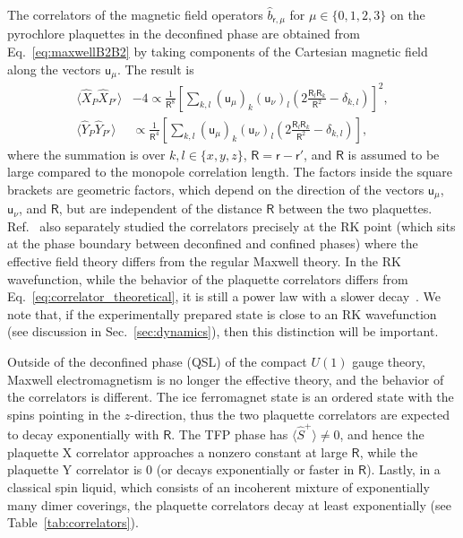 \documentclass[twocolumn,superscriptaddress,amsmath,amssymb,aps,prx,nofootinbib]{revtex4-2}
\newcommand{\dual}[1]{\boldsymbol{\mathsf{#1}}}
\begin{document}
The correlators of the magnetic field operators $\hat{b}_{\dual{r},\mu}$ for $\mu \in \{ 0,1,2,3 \}$ on the pyrochlore plaquettes in the deconfined phase are obtained from Eq.~\eqref{eq:maxwellB2B2} by taking components of the Cartesian magnetic field along the vectors $\dual{u}_\mu$.
The result is
\begin{equation}\label{eq:correlator_theoretical}
  \begin{aligned}
    \langle \hat{X}_P \hat{X}_{P'} \rangle &-4 \propto \frac{1}{\mathsf{R}^8} \left[ \sum_{k,l  } ( \dual{u}_\mu )_k ( \dual{u}_\nu )_l  \left(  2 \frac{\mathsf{R}_l \mathsf{R}_k}{\mathsf{R}^2} -  \delta_{k,l} \right) \right]^2 ,\\
    \langle \hat{Y}_P \hat{Y}_{P'} \rangle &  \propto \frac{1}{\mathsf{R}^4} \left[ \sum_{k,l  } ( \dual{u}_\mu )_k ( \dual{u}_\nu )_l  \left(  2 \frac{\mathsf{R}_l \mathsf{R}_k}{\mathsf{R}^2} -  \delta_{k,l} \right) \right],
\end{aligned}
\end{equation}
where the summation is over $k,l \in \{ x,y,z \}$, $\dual{R} = \dual{r} - \dual{r}'$, and $\mathsf{R}$ is assumed to be large compared to the monopole correlation length. The factors inside the square brackets are geometric factors, which depend on the direction of the vectors $\dual{u}_\mu$, $\dual{u}_\nu$, and $\dual{R}$, but are  independent of the distance $\mathsf{R}$ between the two plaquettes. Ref.~\cite{hermele2004} also separately studied the correlators precisely at the RK point (which sits at the phase boundary between deconfined and confined phases) where the effective field theory differs from the regular Maxwell theory. In the RK wavefunction, while the behavior of the plaquette correlators differs from Eq.~\eqref{eq:correlator_theoretical}, it is still a power law with a slower decay~\cite{hermele2004}. We note that, if the experimentally prepared state is close to an RK wavefunction (see discussion in Sec.~\ref{sec:dynamics}), then this distinction will be important.


Outside of the deconfined phase (QSL) of the compact $U(1)$ gauge theory, Maxwell electromagnetism is no longer the effective theory, and the behavior of the correlators is different. The ice ferromagnet state is an ordered state with the spins pointing in the $z$-direction,  thus the two plaquette correlators are expected to decay exponentially with $\mathsf{R}$. The TFP phase  has $\langle \hat{S}^+ \rangle \neq 0$, and hence the plaquette X correlator approaches a nonzero constant at large $\mathsf{R}$, while the plaquette Y correlator is 0 (or decays exponentially or faster in $\mathsf{R}$). Lastly, in a classical spin liquid, which consists of an incoherent mixture of exponentially many dimer coverings, the plaquette correlators  decay at least exponentially (see Table~\ref{tab:correlators}).
\end{document}
